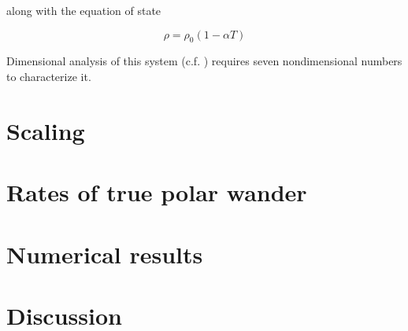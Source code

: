 \documentclass{gji}
\begin{document}
along with the equation of state

\begin{equation}
\rho = \rho_0 \left( 1 - \alpha T \right)
\label{eos}
\end{equation}

Dimensional analysis of this system (c.f. \cite{barenblatt1996scaling}) requires seven nondimensional numbers to characterize it.



\section{Scaling}

\section{Rates of true polar wander}

\section{Numerical results}

\section{Discussion}


\begin{acknowledgments}
\end{acknowledgments}





\label{lastpage}
\end{document}
